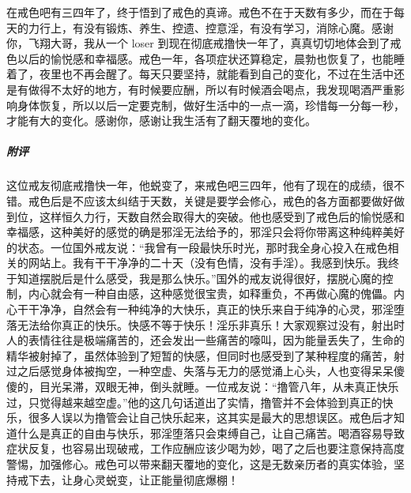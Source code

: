 \begin{case}
    在戒色吧有三四年了，终于悟到了戒色的真谛。戒色不在于天数有多少，而在于每天的力行上，有没有锻炼、养生、控遗、控意淫，有没有学习，消除心魔。感谢你，飞翔大哥，我从一个 loser 到现在彻底戒撸快一年了，真真切切地体会到了戒色以后的愉悦感和幸福感。戒色一年，各项症状还算稳定，晨勃也恢复了，也能睡着了，夜里也不再会醒了。每天只要坚持，就能看到自己的变化，不过在生活中还是有做得不太好的地方，有时候要应酬，所以有时候酒会喝点，我发现喝酒严重影响身体恢复，所以以后一定要克制，做好生活中的一点一滴，珍惜每一分每一秒，才能有大的变化。感谢你，感谢让我生活有了翻天覆地的变化。
    \subparagraph{附评} 这位戒友彻底戒撸快一年，他蜕变了，来戒色吧三四年，他有了现在的成绩，很不错。戒色后是不应该太纠结于天数，关键是要学会修心，戒色的各方面都要做好做到位，这样恒久力行，天数自然会取得大的突破。他也感受到了戒色后的愉悦感和幸福感，这种美好的感觉的确是邪淫无法给予的，邪淫只会将你带离这种纯粹美好的状态。一位国外戒友说：“我曾有一段最快乐时光，那时我全身心投入在戒色相关的网站上。我有干干净净的二十天（没有色情，没有手淫）。我感到快乐。我终于知道摆脱后是什么感受，我是那么快乐。”国外的戒友说得很好，摆脱心魔的控制，内心就会有一种自由感，这种感觉很宝贵，如释重负，不再做心魔的傀儡。内心干干净净，自然会有一种纯净的大快乐，真正的快乐来自于纯净的心灵，邪淫堕落无法给你真正的快乐。快感不等于快乐！淫乐非真乐！大家观察过没有，射出时人的表情往往是极端痛苦的，还会发出一些痛苦的嚎叫，因为能量丢失了，生命的精华被射掉了，虽然体验到了短暂的快感，但同时也感受到了某种程度的痛苦，射过之后感觉身体被掏空，一种空虚、失落与无力的感觉涌上心头，人也变得呆呆傻傻的，目光呆滞，双眼无神，倒头就睡。一位戒友说：“撸管八年，从未真正快乐过，只觉得越来越空虚。”他的这几句话道出了实情，撸管并不会体验到真正的快乐，很多人误以为撸管会让自己快乐起来，这其实是最大的思想误区。戒色后才知道什么是真正的自由与快乐，邪淫堕落只会束缚自己，让自己痛苦。喝酒容易导致症状反复，也容易出现破戒，工作应酬应该少喝为妙，喝了之后也要注意保持高度警惕，加强修心。戒色可以带来翻天覆地的变化，这是无数亲历者的真实体验，坚持戒下去，让身心灵蜕变，让正能量彻底爆棚！
\end{case}

